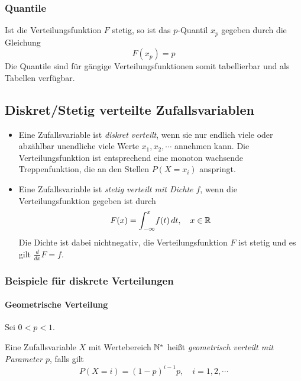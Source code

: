             \subsubsection{Quantile}
                Ist die Verteilungsfunktion \(F\) stetig, so ist das \(p\)-Quantil \(x_p\) gegeben durch die Gleichung
                \begin{equation*}
                    F(x_p) = p
                \end{equation*}
                Die Quantile sind für gängige Verteilungsfunktionen somit tabellierbar und als Tabellen verfügbar.

        \subsection{Diskret/Stetig verteilte Zufallsvariablen}
            \begin{itemize}
            	\item Eine Zufallsvariable ist \textit{diskret verteilt}, wenn sie nur endlich viele oder abzählbar unendliche viele Werte \( x_1, x_2, \cdots \) annehmen kann. Die Verteilungsfunktion ist entsprechend eine monoton wachsende Treppenfunktion, die an den Stellen \( P(X = x_i) \) anspringt.
            	\item Eine Zufallsvariable ist \textit{stetig verteilt mit Dichte \(f\)}, wenn die Verteilungsfunktion gegeben ist durch
                	\begin{equation*}
	                	F(x) = \int_{-\infty}^{x} \! f(t) \, dt, \quad x \in \mathbb{R}
                	\end{equation*}
                	Die Dichte ist dabei nichtnegativ, die Verteilungsfunktion \(F\) ist stetig und es gilt \( \frac{d}{dx} F = f \).
            \end{itemize}

            \subsubsection{Beispiele für diskrete Verteilungen}
                \paragraph{Geometrische Verteilung}
                    Sei \( 0 < p < 1 \).
                    
                    Eine Zufallsvariable \(X\) mit Wertebereich \( \mathbb{N}^* \) heißt \textit{geometrisch verteilt mit Parameter \(p\)}, falls gilt
                    \begin{equation*}
	                    P(X = i) = (1 - p) ^ { i - 1 } p, \quad i = 1, 2, \cdots
                    \end{equation*}
                    
